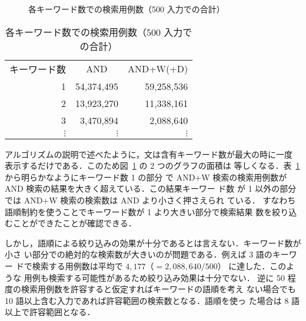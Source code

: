 \begin{figure}
 \begin{center}
  \caption{各キーワード数での検索用例数（500 入力での合計）}
  \label{fig:kazu}
 \end{center}
\end{figure}
\begin{table}
 \begin{center}
  \caption{各キーワード数での検索用例数（500 入力での合計）}
  \label{tab:kazu}
   \begin{tabular}{r|r|r}\hline\hline
    \multicolumn{1}{c|}{キーワード数} & \multicolumn{1}{c|}{AND} & \multicolumn{1}{c}{AND+W(+D)}\\\cline{1-3}
    1 & 54,374,495 & 59,258,536\\
    2 & 13,923,270 & 11,338,161\\
    3 & 3,470,894 & 2,088,640\\
    $\vdots$ & $\vdots$ & $\vdots$\\\hline
    
    
    
    
    
    
    
    
    
    
    
    
    
    
    
    
    
    
    
    
    
    
    
    
    
    
    
    
    
  \end{tabular}
 \end{center}
\end{table}
アルゴリズムの説明で述べたように，文は含有キーワード数が最大の時に一度
表示するだけである．このため図~\ref{fig:kazu} の 2 つのグラフの面積は
等しくなる．表~\ref{tab:kazu} から明らかなようにキーワード数 1 の部分
で AND+W 検索の検索用例数が AND 検索の結果を大きく超えている．この結果キーワー
ド数 が 1 以外の部分では AND+W 検索の検索数は AND より小さく押さえられ
ている．
すなわち語順制約を使うことでキーワード数が 1 より大きい部分で検索結果
数を絞り込むことができたことが確認できる．

しかし，語順による絞り込みの効果が十分であるとは言えない．キーワード数が小さ
い部分での絶対的な検索数が大きいのが問題である．例えば 3 語のキーワー
ドで検索する用例数は平均で $4,177$（$= 2,088,640/500$） に達した．このような
用例も検索する可能性があるため絞り込み効果は十分でない．
逆に 50 程度の検索用例数を許容すると仮定すればキーワードの語順を考え
ない場合でも 10 語以上含む入力であれば許容範囲の検索数となる．語順を使っ
た場合は 8 語以上で許容範囲となる．
\vspace*{-4mm}
